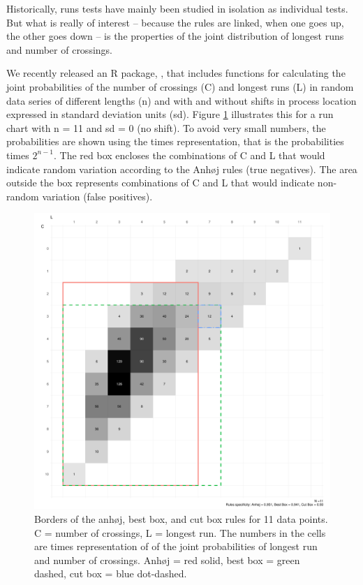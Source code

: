 Historically, runs tests have mainly been studied in isolation as
individual tests. But what is really of interest -- because the rules
are linked, when one goes up, the other goes down -- is the properties
of the joint distribution of longest runs and number of crossings.

We recently released an R package,  \citep{twl2018},
that includes functions for calculating the joint probabilities of the
number of crossings (C) and longest runs (L) in random data series of
different lengths (n) and with and without shifts in process location
expressed in standard deviation units (sd). Figure \ref{figure:box11}
illustrates this for a run chart with n = 11 and sd = 0 (no shift). To
avoid very small numbers, the probabilities are shown using the times
representation, that is the probabilities times \(2^{n-1}\). The red box
encloses the combinations of C and L that would indicate random
variation according to the Anhøj rules (true negatives). The area
outside the box represents combinations of C and L that would indicate
non-random variation (false positives).

\begin{figure}[htbp]
  \centering
  \includegraphics[width=\textwidth]{fig_box11.pdf}
  \caption{Borders of the anhøj, best box, and cut box rules for 11 data points. 
           C = number of crossings, L = longest run.
           The numbers in the cells are times representation of of the joint
           probabilities of longest run and number of crossings.
           Anhøj = red solid, best box = green dashed, cut box = blue dot-dashed.}
  \label{figure:box11}
\end{figure}

